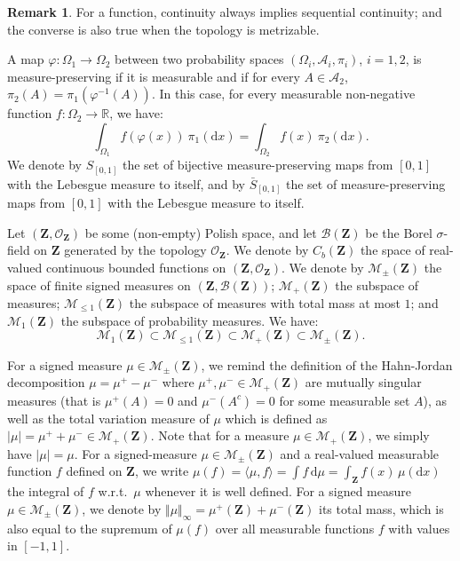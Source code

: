 \documentclass{amsart}
\newcommand{\wrt}{w.r.t.\ }
\theoremstyle{plain}
\theoremstyle{definition}
\newtheorem{remark}[Th]{Remark}
\newcommand{\Space}{\mathbf{Z}}
\newcommand{\Topo}{\mathcal{O}_\Space}
\newcommand{\Borel}{\mathcal{B}(\Space)}
\newcommand{\Proba}{\mathcal{M}_1(\Space)}
\newcommand{\SubProba}{\mathcal{M}_{\leq1}(\Space)}
\newcommand{\Meas}{\mathcal{M}_+(\Space)}
\newcommand{\SignedMeas}{\mathcal{M}_{\pm}(\Space)}
\newcommand{\CbFunct}{C_b(\Space)}
\newcommand{\TotalMass}[1]{\norm{#1}_\infty}
\newcommand{\InvRelabel}{S_{[0,1]}}
\newcommand{\Relabel}{\bar{S}_{[0,1]}}
\newcommand{\R}{\mathbb{R}}
\newcommand{\drv}{\mathrm{d}}
\newcommand{\rd}{\mathrm{d}}
\newcommand{\norm}[1]{\Vert#1\Vert}
\begin{document}
  \begin{remark}\label{rem:cont_seq_cont}
 For a function, continuity always implies sequential continuity;
 and the converse is also true when the topology is metrizable.
 \end{remark}
 
\medskip


A map $\varphi : \Omega_1 \to \Omega_2$
between two probability spaces $(\Omega_i, \mathcal{A}_i, \pi_i)$,
$i=1,2$, is measure-preserving if it is measurable and
if for every $A\in \mathcal{A}_2$, $\pi_2(A) = \pi_1(\varphi^{-1}(A))$.
In this case, for every measurable non-negative function $f: \Omega_2 \to \R$,
we have:
\begin{equation}
   \label{eq:re-label}
 \int_{\Omega_1} f(\varphi(x))\ \pi_1(\drv x) = \int_{\Omega_2} f(x)\
 \pi_2(\drv x).
\end{equation}
We denote
by $  \InvRelabel$ the set of bijective measure-preserving maps
from $[0,1]$ with the Lebesgue measure to itself, and by
$\Relabel$ the set of   measure-preserving maps
from $[0,1]$ with the Lebesgue measure to itself. 
\medskip


Let $(\Space,\Topo)$ be some (non-empty) Polish space,
and let $\Borel$ be the Borel $\sigma$-field on $\Space$ generated by the topology $\Topo$.
We  denote by  $\CbFunct$ the  space of  real-valued continuous  bounded
functions on $(\Space,\Topo)$.
We   denote  by   $\SignedMeas$  the   space  of  finite signed  measures   on
$(\Space,\Borel)$; $\Meas$  the  subspace  of
 measures; $\SubProba$  the subspace  of  measures  with total
mass at most $1$; and $\Proba$ the subspace of probability measures.  We
have:
\[
  \Proba \subset \SubProba \subset \Meas \subset \SignedMeas .
\]

For  a   signed  measure  $\mu\in\SignedMeas$,  we remind the definition of the  Hahn-Jordan
decomposition $\mu  = \mu^+ -  \mu^-$ where $\mu^+, \mu^-  \in\Meas$ are
mutually singular measures (that  is $\mu^+(A)=0$ and $\mu^-(A^c)=0$ for
some measurable set $A$), as well as the total variation measure of $\mu$
which is defined as  $\vert\mu\vert  =   \mu^+  +  \mu^-  \in  \Meas$.    Note  that  for a measure
$\mu\in\Meas$, we  simply have $\vert  \mu \vert  = \mu$.  
For a signed-measure $\mu\in \SignedMeas$ and a real-valued measurable
function $f$ defined on $\Space$, we write $\mu(f)=\langle \mu, f \rangle=
\int f \, \rd \mu=\int_{\Space} f(x)\, \mu(\rd x)$ the integral of $f$ \wrt $\mu$ whenever it is well defined. 
For  a signed
measure         $\mu\in\SignedMeas$,         we        denote         by
$\TotalMass{\mu}=\mu^+(\Space) + \mu^-(\Space)$ its total mass, which is
also equal  to the supremum  of $\mu(f)$ over  all measurable
functions   $f$   with  values   in   $[-1,1]$.
\end{document}
